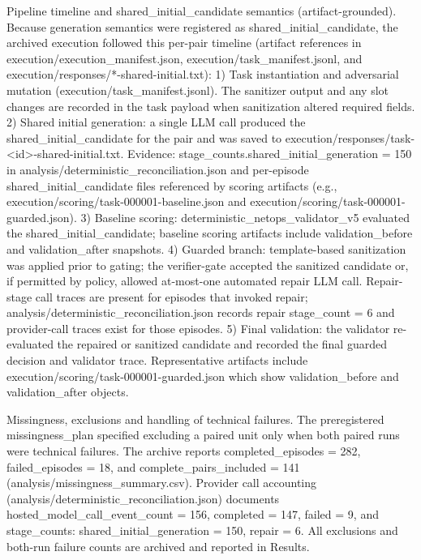 \documentclass[conference]{IEEEtran}
\begin{document}
Pipeline timeline and shared\_initial\_candidate semantics (artifact-grounded). Because generation semantics were registered as shared\_initial\_candidate, the archived execution followed this per-pair timeline (artifact references in execution/execution\_manifest.json, execution/task\_manifest.jsonl, and execution/responses/*-shared-initial.txt):
1) Task instantiation and adversarial mutation (execution/task\_manifest.jsonl). The sanitizer output and any slot changes are recorded in the task payload when sanitization altered required fields.
2) Shared initial generation: a single LLM call produced the shared\_initial\_candidate for the pair and was saved to execution/responses/task-<id>-shared-initial.txt. Evidence: stage\_counts.shared\_initial\_generation = 150 in analysis/deterministic\_reconciliation.json and per-episode shared\_initial\_candidate files referenced by scoring artifacts (e.g., execution/scoring/task-000001-baseline.json and execution/scoring/task-000001-guarded.json).
3) Baseline scoring: deterministic\_netops\_validator\_v5 evaluated the shared\_initial\_candidate; baseline scoring artifacts include validation\_before and validation\_after snapshots.
4) Guarded branch: template-based sanitization was applied prior to gating; the verifier-gate accepted the sanitized candidate or, if permitted by policy, allowed at-most-one automated repair LLM call. Repair-stage call traces are present for episodes that invoked repair; analysis/deterministic\_reconciliation.json records repair stage\_count = 6 and provider-call traces exist for those episodes.
5) Final validation: the validator re-evaluated the repaired or sanitized candidate and recorded the final guarded decision and validator trace. Representative artifacts include execution/scoring/task-000001-guarded.json which show validation\_before and validation\_after objects.

Missingness, exclusions and handling of technical failures. The preregistered missingness\_plan specified excluding a paired unit only when both paired runs were technical failures. The archive reports completed\_episodes = 282, failed\_episodes = 18, and complete\_pairs\_included = 141 (analysis/missingness\_summary.csv). Provider call accounting (analysis/deterministic\_reconciliation.json) documents hosted\_model\_call\_event\_count = 156, completed = 147, failed = 9, and stage\_counts: shared\_initial\_generation = 150, repair = 6. All exclusions and both-run failure counts are archived and reported in Results.
\end{document}
